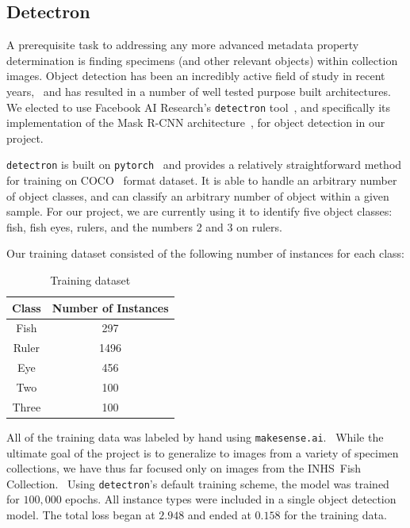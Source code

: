 \documentclass[screen,review]{acmart}
\begin{document}
\subsection{Detectron}
A prerequisite task to addressing any more advanced metadata property determination is finding specimens (and other relevant objects) within collection images. Object detection has been an incredibly active field of study in recent years,~\cite{zou2019object} and has resulted in a number of well tested purpose built architectures. We elected to use Facebook AI Research's \verb|detectron| tool~\cite{wu2019detectron2}, and specifically its implementation of the Mask R-CNN architecture~\cite{he2018mask}, for object detection in our project.

\verb|detectron| is built on \verb|pytorch|~\cite{NEURIPS2019_9015} and provides a relatively straightforward method for training on COCO~\cite{DBLP:journals/corr/LinMBHPRDZ14} format dataset. It is able to handle an arbitrary number of object classes, and can classify an arbitrary number of object within a given sample. For our project, we are currently using it to identify five object classes: fish, fish eyes, rulers, and the numbers 2 and 3 on rulers.

Our training dataset consisted of the following number of instances for each class:

\begin{table}[H]
    \centering
    \caption{Training dataset}
    \label{tab:dataset}
    \begin{tabular}{cc}
        \toprule
        \textbf{Class} & \textbf{Number of Instances}\\
        \midrule
        Fish & 297\\
        Ruler & 1496\\
        Eye & 456\\
        Two & 100\\
        Three & 100\\
      \bottomrule
\end{tabular}
\end{table}

All of the training data was labeled by hand using \verb|makesense.ai|.~\cite{make-sense} While the ultimate goal of the project is to generalize to images from a variety of specimen collections, we have thus far focused only on images from the INHS\ Fish Collection.~\cite{INHS} Using \verb|detectron|'s default training scheme, the model was trained for \(100,000\) epochs. All instance types were included in a single object detection model. The total loss began at \(2.948\) and ended at \(0.158\) for the training data.
\end{document}
